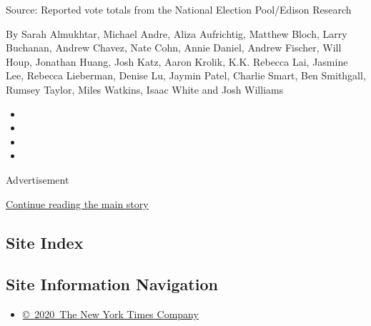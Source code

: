 Source: Reported vote totals from the National Election Pool/Edison
Research

By Sarah Almukhtar, Michael Andre, Aliza Aufrichtig, Matthew Bloch,
Larry Buchanan, Andrew Chavez, Nate Cohn, Annie Daniel, Andrew Fischer,
Will Houp, Jonathan Huang, Josh Katz, Aaron Krolik, K.K. Rebecca Lai,
Jasmine Lee, Rebecca Lieberman, Denise Lu, Jaymin Patel, Charlie Smart,
Ben Smithgall, Rumsey Taylor, Miles Watkins, Isaac White and Josh
Williams

\begin{itemize}
\item
\item
\item
\item
\end{itemize}

Advertisement

\protect\hyperlink{after-bottom}{Continue reading the main story}

\hypertarget{site-index}{%
\subsection{Site Index}\label{site-index}}

\hypertarget{site-information-navigation}{%
\subsection{Site Information
Navigation}\label{site-information-navigation}}

\begin{itemize}
\tightlist
\item
  \href{https://help.nytimes3xbfgragh.onion/hc/en-us/articles/115014792127-Copyright-notice}{©~2020~The
  New York Times Company}
\end{itemize}

